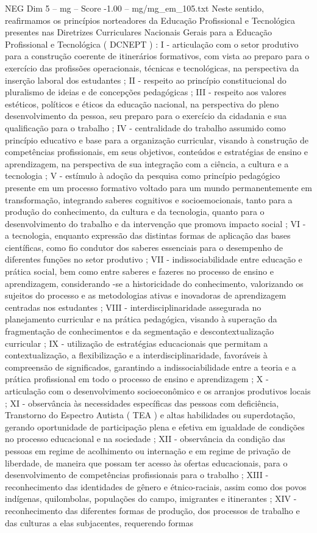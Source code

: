 \begin{textsample}{NEG Dim 5 – mg – Score -1.00 – mg/mg\_em\_105.txt}
Neste sentido, reafirmamos os princípios norteadores da Educação Profissional e Tecnológica presentes nas Diretrizes Curriculares Nacionais Gerais para a Educação Profissional e Tecnológica ( DCNEPT ) : I - articulação com o setor produtivo para a construção coerente de itinerários formativos, com vista ao preparo para o exercício das profissões operacionais, técnicas e tecnológicas, na perspectiva da inserção laboral dos estudantes ; II - respeito ao princípio constitucional do pluralismo de ideias e de concepções pedagógicas ; III - respeito aos valores estéticos, políticos e éticos da educação nacional, na perspectiva do pleno desenvolvimento da pessoa, seu preparo para o exercício da cidadania e sua qualificação para o trabalho ; IV - centralidade do trabalho assumido como princípio educativo e base para a organização curricular, visando à construção de competências profissionais, em seus objetivos, conteúdos e estratégias de ensino e aprendizagem, na perspectiva de sua integração com a ciência, a cultura e a tecnologia ; V - estímulo à adoção da pesquisa como princípio pedagógico presente em um processo formativo voltado para um mundo permanentemente em transformação, integrando saberes cognitivos e socioemocionais, tanto para a produção do conhecimento, da cultura e da tecnologia, quanto para o desenvolvimento do trabalho e da intervenção que promova impacto social ; VI - a tecnologia, enquanto expressão das distintas formas de aplicação das bases científicas, como fio condutor dos saberes essenciais para o desempenho de diferentes funções no setor produtivo ; VII - indissociabilidade entre educação e prática social, bem como entre saberes e fazeres no processo de ensino e aprendizagem, considerando -se a historicidade do conhecimento, valorizando os sujeitos do processo e as metodologias ativas e inovadoras de aprendizagem centradas nos estudantes ; VIII - interdisciplinaridade assegurada no planejamento curricular e na prática pedagógica, visando à superação da fragmentação de conhecimentos e da segmentação e descontextualização curricular ; IX - utilização de estratégias educacionais que permitam a contextualização, a flexibilização e a interdisciplinaridade, favoráveis à compreensão de significados, garantindo a indissociabilidade entre a teoria e a prática profissional em todo o processo de ensino e aprendizagem ; X - articulação com o desenvolvimento socioeconômico e os arranjos produtivos locais ; XI - observância às necessidades específicas das pessoas com deficiência, Transtorno do Espectro Autista ( TEA ) e altas habilidades ou superdotação, gerando oportunidade de participação plena e efetiva em igualdade de condições no processo educacional e na sociedade ; XII - observância da condição das pessoas em regime de acolhimento ou internação e em regime de privação de liberdade, de maneira que possam ter acesso às ofertas educacionais, para o desenvolvimento de competências profissionais para o trabalho ; XIII - reconhecimento das identidades de gênero e étnico-raciais, assim como dos povos indígenas, quilombolas, populações do campo, imigrantes e itinerantes ; XIV - reconhecimento das diferentes formas de produção, dos processos de trabalho e das culturas a elas subjacentes, requerendo formas 
\end{textsample}
